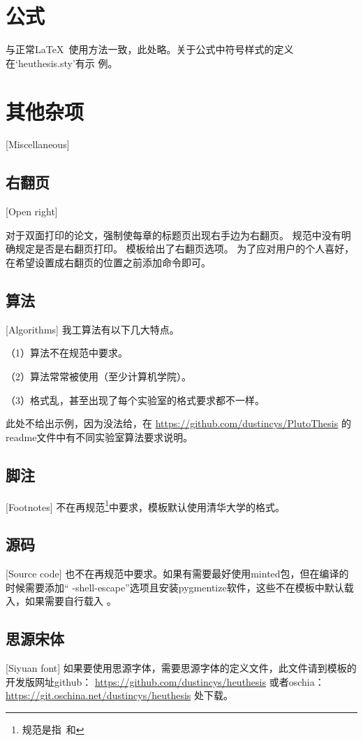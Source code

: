 \section{公式}
与正常\LaTeX\ 使用方法一致，此处略。关于公式中符号样式的定义在`heuthesis.sty'有示
例。

\section{其他杂项}[Miscellaneous]

\subsection{右翻页}[Open right]

对于双面打印的论文，强制使每章的标题页出现右手边为右翻页。
规范中没有明确规定是否是右翻页打印。
模板给出了右翻页选项。
为了应对用户的个人喜好，在希望设置成右翻页的位置之前添加命令即可。

\subsection{算法}[Algorithms]
我工算法有以下几大特点。

（1）算法不在规范中要求。

（2）算法常常被使用（至少计算机学院）。

（3）格式乱，甚至出现了每个实验室的格式要求都不一样。

此处不给出示例，因为没法给，在
\href{https://github.com/dustincys/PlutoThesis}{https://github.com/dustincys/PlutoThesis}
的readme文件中有不同实验室算法要求说明。

\subsection{脚注}[Footnotes]
不在再规范\footnote{规范是指\PGR\ 和\UGR}中要求，模板默认使用清华大学的格式。

\subsection{源码}[Source code]
也不在再规范中要求。如果有需要最好使用minted包，但在编译的时候需要添加“
-shell-escape”选项且安装pygmentize软件，这些不在模板中默认载入，如果需要自行载入
。
\subsection{思源宋体}[Siyuan font]
如果要使用思源字体，需要思源字体的定义文件，此文件请到模板的开发版网址github：
\href{https://github.com/dustincys/heuthesis}{https://github.com/dustincys/heuthesis}
或者oschia：
\href{https://git.oschina.net/dustincys/heuthesis}{https://git.oschina.net/dustincys/heuthesis}
处下载。

